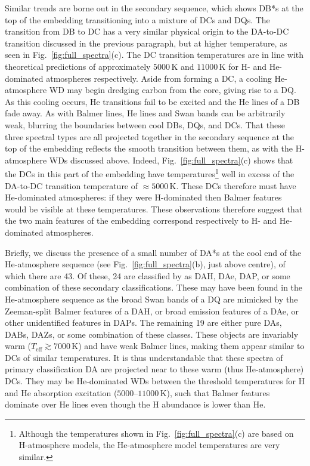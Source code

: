 \documentclass[fleqn,usenatbib]{mnras}
\def\Teff{T_\mathrm{eff}}
\begin{document}
Similar trends are borne out in the secondary sequence, which shows DB*s at the top of the embedding transitioning into a mixture of DCs and DQs.
The transition from DB to DC has a very similar physical origin to the DA-to-DC transition discussed in the previous paragraph, but at higher temperature, as seen in Fig.~\ref{fig:full_spectra}(c).
The DC transition temperatures are in line with theoretical predictions of approximately $5000\,\text{K}$ and $11000\,\text{K}$ for H- and He-dominated atmospheres respectively.
Aside from forming a DC, a cooling He-atmosphere WD may begin dredging carbon from the core, giving rise to a DQ.
As this cooling occurs, He transitions fail to be excited and the He lines of a DB fade away.
As with Balmer lines, He lines and Swan bands can be arbitrarily weak, blurring the boundaries between cool DBs, DQs, and DCs.
That these three spectral types are all projected together in the secondary sequence at the top of the embedding reflects the smooth transition between them, as with the H-atmosphere WDs discussed above.
Indeed, Fig.~\ref{fig:full_spectra}(c) shows that the DCs in this part of the embedding have temperatures\footnote{
    Although the temperatures shown in Fig.~\ref{fig:full_spectra}(c) are based on H-atmosphere models, the He-atmosphere model temperatures are very similar.
} well in excess of the DA-to-DC transition temperature of $\approx 5000\,\text{K}$.
These DCs therefore must have He-dominated atmospheres: if they were H-dominated then Balmer features would be visible at these temperatures.
These observations therefore suggest that the two main features of the embedding correspond respectively to H- and He-dominated atmospheres.

Briefly, we discuss the presence of a small number of DA*s at the cool end of the He-atmosphere sequence (see Fig.~\ref{fig:full_spectra}(b), just above centre), of which there are 43.
Of these, 24 are classified by \citet{manser24} as DAH, DAe, DAP, or some combination of these secondary classifications.
These may have been found in the He-atmosphere sequence as the broad Swan bands of a DQ are mimicked by the Zeeman-split Balmer features of a DAH, or broad emission features of a DAe, or other unidentified features in DAPs.
The remaining 19 are either pure DAs, DABs, DAZs, or some combination of these classes.
These objects are invariably warm ($\Teff \gtrsim 7000\,\text{K}$) and have weak Balmer lines, making them appear similar to DCs of similar temperatures.
It is thus understandable that these spectra of primary classification DA are projected near to these warm (thus He-atmosphere) DCs.
They may be He-dominated WDs between the threshold temperatures for H and He absorption excitation ($5000$--$11000\,\text{K}$), such that Balmer features dominate over He lines even though the H abundance is lower than He.
\end{document}
